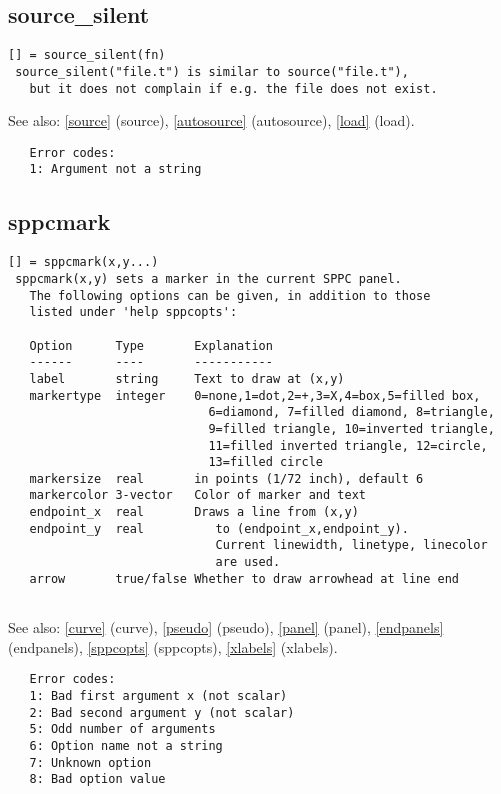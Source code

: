 \documentclass[a4paper]{article}
\begin{document}
\subsection{source\_silent\label{source_silent}}

\begin{tscreen}
\begin{verbatim}
[] = source_silent(fn)
 source_silent("file.t") is similar to source("file.t"),
   but it does not complain if e.g. the file does not exist.
\end{verbatim}

See also: \ref{source} {(source)}, \ref{autosource} {(autosource)}, \ref{load} {(load)}.
\begin{verbatim}
   Error codes:
   1: Argument not a string 
\end{verbatim}
\end{tscreen}





\subsection{sppcmark\label{sppcmark}}

\begin{tscreen}
\begin{verbatim}
[] = sppcmark(x,y...)
 sppcmark(x,y) sets a marker in the current SPPC panel.
   The following options can be given, in addition to those
   listed under 'help sppcopts':

   Option      Type       Explanation
   ------      ----       -----------
   label       string     Text to draw at (x,y)
   markertype  integer    0=none,1=dot,2=+,3=X,4=box,5=filled box,
                            6=diamond, 7=filled diamond, 8=triangle,
                            9=filled triangle, 10=inverted triangle,
                            11=filled inverted triangle, 12=circle,
                            13=filled circle
   markersize  real       in points (1/72 inch), default 6
   markercolor 3-vector   Color of marker and text
   endpoint_x  real       Draws a line from (x,y)
   endpoint_y  real          to (endpoint_x,endpoint_y).
                             Current linewidth, linetype, linecolor
                             are used.
   arrow       true/false Whether to draw arrowhead at line end                                                  
   
\end{verbatim}

See also: \ref{curve} {(curve)}, \ref{pseudo} {(pseudo)}, \ref{panel} {(panel)}, \ref{endpanels} {(endpanels)}, \ref{sppcopts} {(sppcopts)}, \ref{xlabels} {(xlabels)}.
\begin{verbatim}
   Error codes:
   1: Bad first argument x (not scalar)
   2: Bad second argument y (not scalar)
   5: Odd number of arguments
   6: Option name not a string
   7: Unknown option
   8: Bad option value
\end{verbatim}
\end{tscreen}
\end{document}
